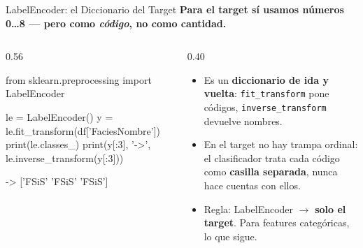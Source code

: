 \documentclass[aspectratio=169, 11pt]{beamer}
\begin{document}
\begin{frame}[fragile,shrink=22]{LabelEncoder: el Diccionario del Target}
  \vspace{-4pt}
  {\small\color{arcaDark}\bfseries
    Para el \textbf{target} sí usamos números 0\ldots8 --- pero como \emph{código}, no como cantidad.}

  \vspace{4pt}
  \begin{columns}[T]
    \begin{column}{0.56\textwidth}
      \begin{pyblock}
from sklearn.preprocessing import LabelEncoder

le = LabelEncoder()
y = le.fit_transform(df['FaciesNombre'])
print(le.classes_)
print(y[:3], '->',
      le.inverse_transform(y[:3]))
      \end{pyblock}
      \vspace{2pt}
      \begin{outputblock} -> ['FSiS' 'FSiS' 'FSiS']
      \end{outputblock}
    \end{column}
    \begin{column}{0.40\textwidth}
      {\scriptsize\color{textMuted}
      \begin{itemize}\setlength{\itemsep}{5pt}
        \item[{\color{arcaRed}\scriptsize\faBook}]
          Es un \textbf{diccionario de ida y vuelta}:
          \texttt{fit\_transform} pone códigos,
          \texttt{inverse\_transform} devuelve nombres.
        \item[{\color{codeGreen}\scriptsize\faCheck}]
          En el target no hay trampa ordinal: el clasificador
          trata cada código como \textbf{casilla separada},
          nunca hace cuentas con ellos.
        \item[{\color{arcaRed}\scriptsize\faArrowRight}]
          Regla: LabelEncoder \(\to\) \textbf{solo el target}.
          Para features categóricas, lo que sigue.
      \end{itemize}
      }
    \end{column}
  \end{columns}
\end{frame}
\end{document}
